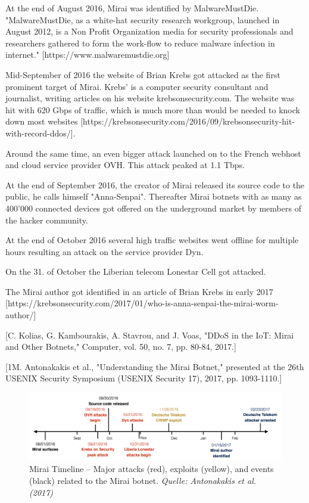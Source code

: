 	At the end of August 2016, Mirai was identified by MalwareMustDie. "MalwareMustDie, as a white-hat security research workgroup, launched in August 2012, is a Non Profit Organization media for security professionals and researchers gathered to form the work-flow to reduce malware infection in internet." [https://www.malwaremustdie.org] 
	
	Mid-September of 2016 the website of Brian Krebs got attacked as the first prominent target of Mirai. Krebs' is a computer security consultant and journalist, writing articles on his website krebsonsecurity.com. The website was hit with 620 Gbps of traffic, which is much more than would be needed to knock down most websites [https://krebsonsecurity.com/2016/09/krebsonsecurity-hit-with-record-ddos/].
	
	Around the same time, an even bigger attack launched on to the French webhost and cloud service provider OVH. This attack peaked at 1.1 Tbps.
	
	At the end of September 2016, the creator of Mirai released its source code to the public, he calls himself "Anna-Senpai". Thereafter Mirai botnets with as many as 400'000 connected devices got offered on the underground market by members of the hacker community.
	
	At the end of October 2016 several high traffic websites went offline for multiple hours resulting an attack on the service provider Dyn.
	
	On the 31. of October the Liberian telecom Lonestar Cell got attacked.
	
	The Mirai author got identified in an article of Brian Krebs in early 2017 [https://krebsonsecurity.com/2017/01/who-is-anna-senpai-the-mirai-worm-author/]
	
	[C. Kolias, G. Kambourakis, A. Stavrou, and J. Voas, "DDoS in the IoT: Mirai and Other Botnets," Computer, vol. 50, no. 7, pp. 80-84, 2017.]
	
	[1M. Antonakakis et al., "Understanding the Mirai Botnet," presented at the 26th {USENIX} Security Symposium ({USENIX} Security 17), 2017, pp. 1093-1110.]


	
\begin{figure}[ht]
\begin{center} \includegraphics[scale=0.35]{Talk11/mirai-timeline} \end{center}
\caption{Mirai Timeline -- Major attacks (red), exploits (yellow), and events (black) related to the Mirai botnet. \textit{Quelle: Antonakakis et al. (2017)}}
\label{fig:timeline}
\end{figure}

